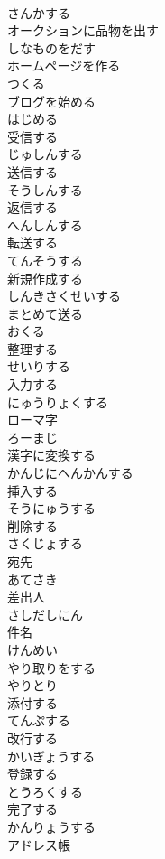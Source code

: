 \documentclass[8pt]{extreport}
\begin{document}
\begin{CJK}{UTF8}{min}
\\	さんかする
\\	オークションに品物を出す	
\\	しなものをだす
\\	ホームページを作る	
\\	つくる
\\	ブログを始める	
\\	はじめる
\\	受信する	
\\	じゅしんする
\\	送信する	
\\	そうしんする
\\	返信する	
\\	へんしんする
\\	転送する	
\\	てんそうする
\\	新規作成する	
\\	しんきさくせいする
\\	まとめて送る	
\\	おくる
\\	整理する	
\\	せいりする
\\	入力する	
\\	にゅうりょくする
\\	ローマ字	
\\	ろーまじ
\\	漢字に変換する	
\\	かんじにへんかんする
\\	挿入する	
\\	そうにゅうする
\\	削除する	
\\	さくじょする
\\	宛先	
\\	あてさき
\\	差出人	
\\	さしだしにん
\\	件名	
\\	けんめい
\\	やり取りをする	
\\	やりとり
\\	添付する	
\\	てんぷする
\\	改行する	
\\	かいぎょうする
\\	登録する	
\\	とうろくする
\\	完了する	
\\	かんりょうする
\\	アドレス帳	

\end{CJK}
\end{document}
